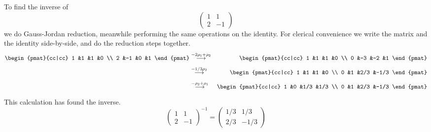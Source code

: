 \begin{example}
To find the inverse of
\begin{equation*}
    \begin{pmatrix}
       1  &1  \\
       2  &-1
    \end{pmatrix}
\end{equation*}
we do Gauss-Jordan reduction, meanwhile performing the same operations on
the identity.
For clerical convenience we write the matrix and the identity side-by-side,
and do the reduction steps together.
\begin{eqnarray*}
    \begin{pmat}{cc|cc}
       1  &1   &1  &0  \\
       2  &-1  &0  &1
    \end{pmat}
  &\grstep{-2\rho_1+\rho_2}
  &\begin{pmat}{cc|cc}
        1  &1   &1  &0  \\
        0  &-3  &-2 &1
     \end{pmat}                 \\
  &\grstep{-1/3\rho_2}
  &\begin{pmat}{cc|cc}
        1  &1   &1   &0     \\
        0  &1   &2/3 &-1/3
     \end{pmat}                   \\
  &\grstep{-\rho_2+\rho_1}
  &\begin{pmat}{cc|cc}
        1  &0   &1/3 &1/3  \\
        0  &1   &2/3 &-1/3
     \end{pmat}
\end{eqnarray*}
This calculation has found the inverse.
\begin{equation*}
    \begin{pmatrix}
       1  &1  \\
       2  &-1
    \end{pmatrix}^{-1}
  =
    \begin{pmatrix}
       1/3 &1/3  \\
       2/3 &-1/3
    \end{pmatrix}
\end{equation*}
\end{example}


